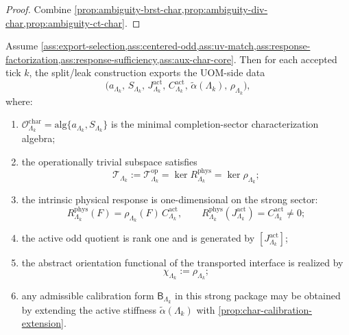 \documentclass[11pt]{article}
\begin{document}
\begin{proof}
Combine \cref{prop:ambiguity-brst-char,prop:ambiguity-div-char,prop:ambiguity-ct-char}.
\end{proof}

\begin{theorem}
\label{thm:uom-char-export}
Assume
\cref{ass:export-selection,ass:centered-odd,ass:uv-match,ass:response-factorization,ass:response-sufficiency,ass:aux-char-core}.
Then for each accepted tick \(k\), the split/leak construction exports the UOM-side data
\begin{equation}
\big(
a_{\Lambda_k},\,
S_{\Lambda_k},\,
J^{\mathrm{act}}_{\Lambda_k},\,
C^{\mathrm{act}}_{\Lambda_k},\,
\widetilde\alpha(\Lambda_k),\,
\rho_{\Lambda_k}
\big),
\label{eq:uom-char-realization}
\end{equation}
where:
\begin{enumerate}[leftmargin=2em]
\item \(\mathcal O^{\mathrm{char}}_{\Lambda_k}=\mathrm{alg}\{a_{\Lambda_k},S_{\Lambda_k}\}\) is the
  minimal completion-sector characterization algebra;
\item the operationally trivial subspace satisfies
  \[
  \mathcal T_{\Lambda_k}:=\mathcal T^{\mathrm{op}}_{\Lambda_k}
  =
  \ker R^{\mathrm{phys}}_{\Lambda_k}
  =
  \ker\rho_{\Lambda_k};
  \]
\item the intrinsic physical response is one-dimensional on the strong sector:
  \[
  R^{\mathrm{phys}}_{\Lambda_k}(F)=\rho_{\Lambda_k}(F)\,C^{\mathrm{act}}_{\Lambda_k},
  \qquad
  R^{\mathrm{phys}}_{\Lambda_k}(J^{\mathrm{act}}_{\Lambda_k})=C^{\mathrm{act}}_{\Lambda_k}\neq 0;
  \]
\item the active odd quotient is rank one and is generated by
  \([J^{\mathrm{act}}_{\Lambda_k}]\);
\item the abstract orientation functional of the transported interface is realized by
  \[
  \chi_{\Lambda_k}:=\rho_{\Lambda_k};
  \]
\item any admissible calibration form \(\mathsf B_{\Lambda_k}\) in this strong package may be obtained by
  extending the active stiffness \(\widetilde\alpha(\Lambda_k)\) with
  \cref{prop:char-calibration-extension}.
\end{enumerate}
\end{theorem}
\end{document}
